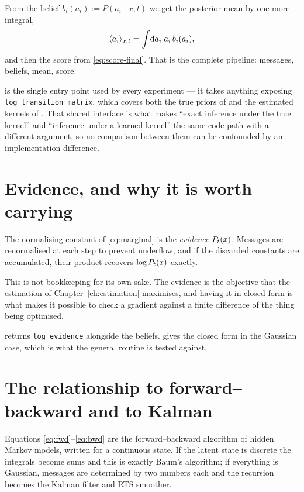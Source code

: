 From the belief $b_i(a_i) := P(a_i\mid x,t)$ we get the posterior mean by one more integral,
\begin{equation}
\langle a_{i} \rangle_{x,t} = \int\!\mathrm{d}a_i\; a_i\, b_i(a_i),
\end{equation}
and then the score from \eqref{eq:score-final}. That is the complete pipeline: messages,
beliefs, mean, score.

\begin{codebox}
 is the single entry point used by every
experiment --- it takes anything exposing \texttt{log\_transition\_matrix}, which covers both
the true priors of  and the estimated kernels of
. That shared interface is what makes ``exact inference under the
true kernel'' and ``inference under a learned kernel'' the same code path with a different
argument, so no comparison between them can be confounded by an implementation difference.
\end{codebox}

\section{Evidence, and why it is worth carrying}

The normalising constant of \eqref{eq:marginal} is the \emph{evidence} $P_t(x)$. Messages are
renormalised at each step to prevent underflow, and if the discarded constants are
accumulated, their product recovers $\log P_t(x)$ exactly.

This is not bookkeeping for its own sake. The evidence is the objective that the estimation of
Chapter~\ref{ch:estimation} maximises, and having it in closed form is what makes it possible
to check a gradient against a finite difference of the thing being optimised.

\begin{codebox}
 returns \texttt{log\_evidence} alongside the beliefs.
 gives the closed form in the Gaussian
case, which is what the general routine is tested against.
\end{codebox}

\section{The relationship to forward--backward and to Kalman}

Equations \eqref{eq:fwd}--\eqref{eq:bwd} are the forward--backward algorithm of hidden Markov
models, written for a continuous state. If the latent state is discrete the integrals become
sums and this is exactly Baum's algorithm; if everything is Gaussian, messages are determined
by two numbers each and the recursion becomes the Kalman filter and RTS smoother.

